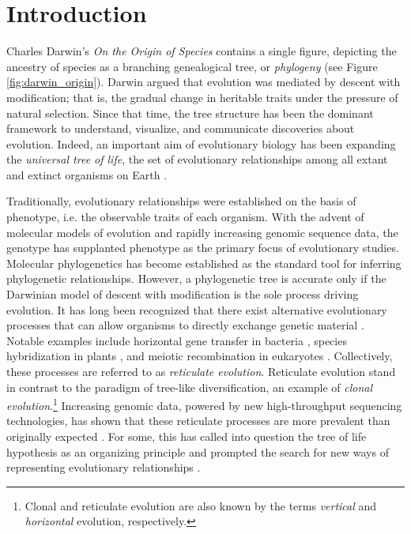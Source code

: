 \chapter{Introduction}
\label{ch:introduction}


Charles Darwin's \emph{On the Origin of Species} contains a single figure, depicting the ancestry of species as a branching genealogical tree, or \emph{phylogeny} \cite{Darwin:1859uh} (see Figure \ref{fig:darwin_origin}).
Darwin argued that evolution was mediated by descent with modification; that is, the gradual change in heritable traits under the pressure of natural selection.
Since that time, the tree structure has been the dominant framework to understand, visualize, and communicate discoveries about evolution.
Indeed, an important aim of evolutionary biology has been expanding the \emph{universal tree of life}, the set of evolutionary relationships among all extant and extinct organisms on Earth \cite{Bowler:2003uz}.

Traditionally, evolutionary relationships were established on the basis of phenotype, i.e. the observable traits of each organism.
With the advent of molecular models of evolution and rapidly increasing genomic sequence data, the genotype has supplanted phenotype as the primary focus of evolutionary studies.
Molecular phylogenetics has become established as the standard tool for inferring phylogenetic relationships.
However, a phylogenetic tree is accurate only if the Darwinian model of descent with modification is the sole process driving evolution.
It has long been recognized that there exist alternative evolutionary processes that can allow organisms to directly exchange genetic material \cite{Arnold:2007vq}.
Notable examples include horizontal gene transfer in bacteria \cite{Ochman:2000dr}, species hybridization in plants \cite{Arnold:1996}, and meiotic recombination in eukaryotes \cite{Coop:2006jl}.
Collectively, these processes are referred to as \emph{reticulate evolution}.
Reticulate evolution stand in contrast to the paradigm of tree-like diversification, an example of \emph{clonal evolution}.\footnote{Clonal and reticulate evolution are also known by the terms \emph{vertical} and \emph{horizontal} evolution, respectively.}
Increasing genomic data, powered by new high-throughput sequencing technologies, has shown that these reticulate processes are more prevalent than originally expected \cite{Boto:2010gg} .
For some, this has called into question the tree of life hypothesis as an organizing principle and prompted the search for new ways of representing evolutionary relationships \cite{Doolittle:1999,OMalley:2011tu,Koonin:2008bt}.

